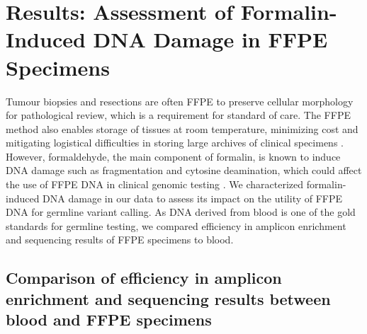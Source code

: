 
\chapter{Results: Assessment of Formalin-Induced DNA Damage in FFPE Specimens}
\label{ch:Results:AssessmentofFormalin-InducedDNADamageinFFPESpecimens}

Tumour biopsies and resections are often FFPE to preserve cellular morphology for pathological review, which is a requirement for standard of care. The FFPE method also enables storage of tissues at room temperature, minimizing cost and mitigating logistical difficulties in storing large archives of clinical specimens \cite{Lou2014}. However, formaldehyde, the main component of formalin, is known to induce DNA damage such as fragmentation and cytosine deamination, which could affect the use of FFPE DNA in clinical genomic testing \cite{Do2015a, Kim2017, Ofner2017, Oh2015, Wong2013, Wong2014, Sikorsky2007}. We characterized formalin-induced DNA damage in our data to assess its impact on the utility of FFPE DNA for germline variant calling. As DNA derived from blood is one of the gold standards for germline testing, we compared efficiency in amplicon enrichment and sequencing results of FFPE specimens to blood.

\section{Comparison of efficiency in amplicon enrichment and sequencing results between blood and FFPE specimens}
\label{sec:ComparisonofefficiencyinampliconenrichmentandsequencingresultsbetweenbloodandFFPEspecimens}


